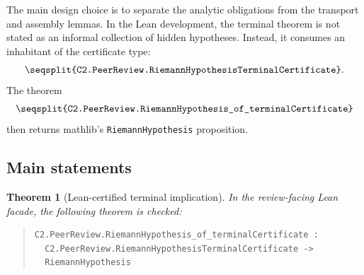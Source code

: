 \documentclass[11pt]{article}
\newtheorem{theorem}{Theorem}[section]
\newcommand{\Lean}[1]{\texttt{\seqsplit{#1}}}
\newcommand{\RH}{\texttt{RiemannHypothesis}}
\begin{document}
The main design choice is to separate the analytic obligations from the
transport and assembly lemmas.  In the Lean development, the terminal theorem is
not stated as an informal collection of hidden hypotheses.  Instead, it consumes
an inhabitant of the certificate type:
\[
  \Lean{C2.PeerReview.RiemannHypothesisTerminalCertificate}.
\]
The theorem
\[
  \Lean{C2.PeerReview.RiemannHypothesis\_of\_terminalCertificate}
\]
then returns mathlib's \RH{} proposition.

\subsection{Main statements}

\begin{theorem}[Lean-certified terminal implication]
\label{thm:terminal-implication}
In the review-facing Lean facade, the following theorem is checked:
\begin{quote}\small
\begin{verbatim}
C2.PeerReview.RiemannHypothesis_of_terminalCertificate :
  C2.PeerReview.RiemannHypothesisTerminalCertificate ->
  RiemannHypothesis
\end{verbatim}
\end{quote}
\end{theorem}
\end{document}
